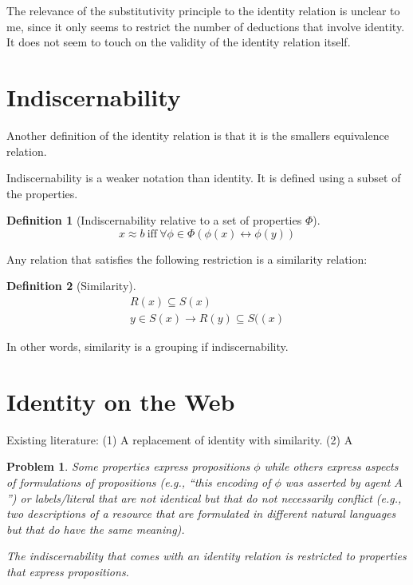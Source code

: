 \documentclass[11pt,a4paper,notitlepage,onecolumn,twoside]{article}
\newtheorem{definition}{Definition}
\newtheorem{problem}{Problem}
\begin{document}
The relevance of the substitutivity principle to the identity relation is unclear to me, since it only seems to restrict the number of deductions that involve identity. It does not seem to touch on the validity of the identity relation itself.

\section{Indiscernability}

Another definition of the identity relation is that it is the smallers equivalence relation.

Indiscernability is a weaker notation than identity. It is defined using a subset of the properties.

\begin{definition}[Indiscernability relative to a set of properties $\Phi$]
\begin{equation}
x \approx b \  \text{iff} \  \forall \phi \in \Phi (\phi(x) \leftrightarrow \phi(y))
\end{equation}
\end{definition}

Any relation that satisfies the following restriction is a similarity relation:

\begin{definition}[Similarity]
\begin{align}
R(x) \subseteq S(x) \\
y \in S(x) \rightarrow R(y) \subseteq S((x)
\end{align}
\end{definition}

In other words, similarity is a grouping if indiscernability.

\section{Identity on the Web}

Existing literature:
(1) A replacement of identity with similarity.
(2) A 

\begin{problem}
Some properties express propositions $\phi$ while others express aspects of formulations of propositions (e.g., ``this encoding of $\phi$ was asserted by agent $A$'') or labels/literal that are not identical but that do not necessarily conflict (e.g., two descriptions of a resource that are formulated in different natural languages but that do have the same meaning).

The indiscernability that comes with an identity relation is restricted to properties that express propositions.
\end{problem}
\end{document}
